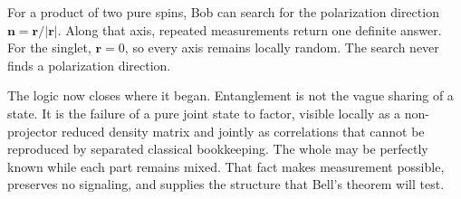 For a product of two pure spins, Bob can search for the polarization direction \(\mathbf n=\mathbf r/|\mathbf r|\). Along that axis, repeated measurements return one definite answer. For the singlet, \(\mathbf r=0\), so every axis remains locally random. The search never finds a polarization direction.

\begin{classroomqa}
\end{classroomqa}

\begin{classroomqa}
\end{classroomqa}

The logic now closes where it began. Entanglement is not the vague sharing of a state. It is the failure of a pure joint state to factor, visible locally as a non-projector reduced density matrix and jointly as correlations that cannot be reproduced by separated classical bookkeeping. The whole may be perfectly known while each part remains mixed. That fact makes measurement possible, preserves no signaling, and supplies the structure that Bell's theorem will test.
